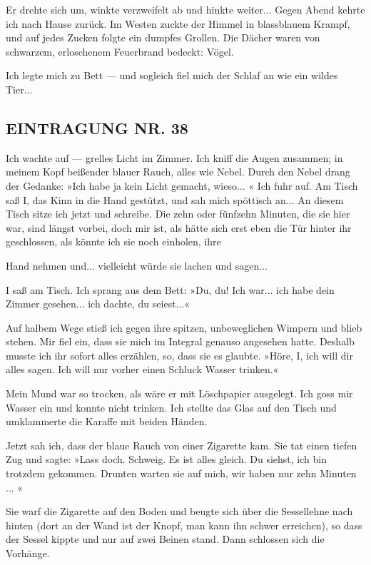 Er drehte sich um, winkte verzweifelt ab und hinkte weiter... Gegen
Abend kehrte ich nach Hause zurück. Im Westen zuckte der Himmel in
blassblauem Krampf, und auf jedes Zucken folgte ein dumpfes
Grollen. Die Dächer waren von schwarzem, erloschenem Feuerbrand
bedeckt: Vögel.

Ich legte mich zu Bett — und sogleich fiel mich der Schlaf an wie
ein wildes Tier...

\subsection{EINTRAGUNG NR. 38}

Ich wachte auf — grelles Licht im Zimmer. Ich kniff die Augen
zusammen; in meinem Kopf beißender blauer Rauch, alles wie Nebel.
Durch den Nebel drang der Gedanke: »Ich habe ja kein Licht gemacht,
wieso... « Ich fuhr auf. Am Tisch saß I, das Kinn in die Hand
gestützt, und sah mich spöttisch an... An diesem Tisch sitze ich
jetzt und schreibe. Die zehn oder fünfzehn Minuten, die sie hier
war, sind längst vorbei, doch mir ist, als hätte sich erst eben die
Tür hinter ihr geschlossen, als könnte ich sie noch einholen, ihre

Hand nehmen und... vielleicht würde sie lachen und sagen...

I saß am Tisch. Ich sprang aus dem Bett: »Du, du! Ich war... ich
habe dein Zimmer gesehen... ich dachte, du seiest...«

Auf halbem Wege stieß ich gegen ihre spitzen, unbeweglichen Wimpern
und blieb stehen. Mir fiel ein, dass sie mich im Integral genauso
angesehen hatte. Deshalb musste ich ihr sofort alles erzählen, so,
dass sie es glaubte. »Höre, I, ich will dir alles sagen. Ich will
nur vorher einen Schluck Wasser trinken.«

Mein Mund war so trocken, als wäre er mit Löschpapier ausgelegt.
Ich goss mir Wasser ein und konnte nicht trinken. Ich stellte das
Glas auf den Tisch und umklammerte die Karaffe mit beiden Händen.

Jetzt sah ich, dass der blaue Rauch von einer Zigarette kam. Sie
tat einen tiefen Zug und sagte: »Lass doch. Schweig. Es ist alles
gleich. Du siehst, ich bin trotzdem gekommen. Drunten warten sie
auf mich, wir haben nur zehn Minuten ... «

Sie warf die Zigarette auf den Boden und beugte sich über die
Sessellehne nach hinten (dort an der Wand ist der Knopf, man kann
ihn schwer erreichen), so dass der Sessel kippte und nur auf zwei
Beinen stand. Dann schlossen sich die Vorhänge.

